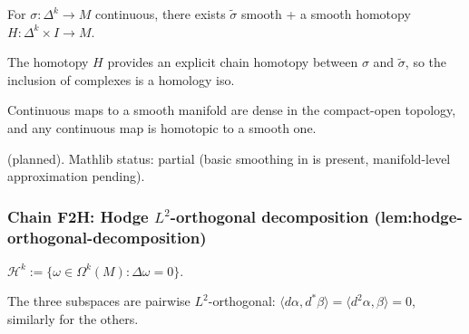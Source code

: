 \begin{lemma}
\label{lem:dsq-r2}
For $\sigma : \Delta^{k} \to M$ continuous, there exists $\tilde\sigma$ smooth + a smooth homotopy $H : \Delta^{k}\times I \to M$.
\leanok
\end{lemma}

\begin{lemma}
\label{lem:dsq-r3}
The homotopy $H$ provides an explicit chain homotopy between $\sigma$ and $\tilde\sigma$, so the inclusion of complexes is a homology iso.
\leanok
\end{lemma}

\begin{lemma}
\label{lem:dsq-r4}
Continuous maps to a smooth manifold are dense in the compact-open topology, and any continuous map is homotopic to a smooth one.
\leanok
\end{lemma}

\begin{lemma}
\label{lem:dsq-r5}
 (planned).  Mathlib status: partial (basic smoothing in  is present, manifold-level approximation pending).
\leanok
\end{lemma}

\subsubsection*{Chain F2H: Hodge $L^{2}$-orthogonal decomposition (lem:hodge-orthogonal-decomposition)}

\begin{lemma}
\label{lem:hod-r1}
$\mathcal{H}^{k} := \{\omega \in \Omega^{k}(M) : \Delta\omega = 0\}$.
\leanok\mathlibok
\end{lemma}

\begin{lemma}[Pass F2H.2: $L^{2}$-decomposition $\Omega^{k} = \mathcal{H}^{k}\oplus\mathrm{im}\,d\oplus\mathrm{im}\,d^{*}$]
\label{lem:hod-r2}
The three subspaces are pairwise $L^{2}$-orthogonal: $\langle d\alpha, d^{*}\beta\rangle = \langle d^{2}\alpha, \beta\rangle = 0$, similarly for the others.
\leanok
\end{lemma}

